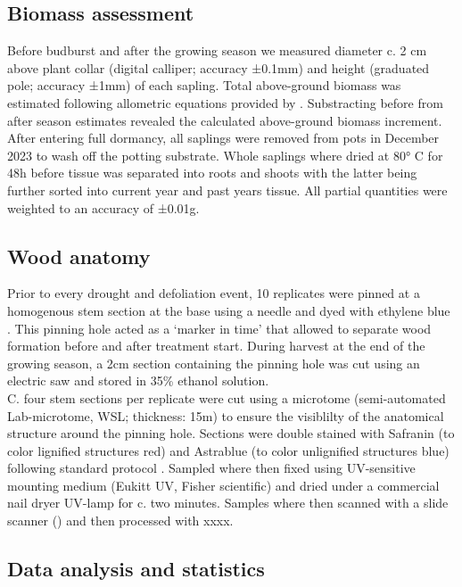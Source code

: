\documentclass{article}
\begin{document}
	\subsection*{Biomass assessment}
	Before budburst and after the growing season we measured diameter c. 2 cm above plant collar (digital calliper; accuracy ±0.1mm) and height (graduated pole; accuracy ±1mm) of each sapling. Total above-ground biomass was estimated following allometric equations provided by \citet{annighoferSpeciesspecificGenericBiomass2016}. Substracting before from after season estimates revealed the calculated above-ground biomass increment.	\\
After entering full dormancy, all saplings were removed from pots in December 2023 to wash off the potting substrate. Whole saplings where dried at 80° C for 48h before tissue was separated into roots and shoots with the latter being further sorted into current year and past years tissue. All partial quantities were weighted to an accuracy of ±0.01g.\\ %

	\subsection*{Wood anatomy}
Prior to every drought and defoliation event, 10 replicates were pinned at a homogenous stem section at the base using a needle and dyed with ethylene blue \citep{gartnerCambialActivityMoringa2021a}. This pinning hole acted as a `marker in time' that allowed to separate wood formation before and after treatment start. During harvest at the end of the growing season, a 2cm section containing the pinning hole was cut using an electric saw and stored in 35\% ethanol solution. \\
C. four stem sections per replicate were cut using a microtome (semi-automated Lab-microtome, WSL; thickness: 15\textmu m) to ensure the visiblilty of the anatomical structure around the pinning hole. Sections were double stained with Safranin (to color lignified structures red) and Astrablue (to color unlignified structures blue) following standard protocol \citep{gartnerMicroscopicPreparationTechniques2013}. Sampled where then fixed using UV-sensitive mounting medium (Eukitt UV, Fisher scientific) and dried under a commercial nail dryer UV-lamp for c. two minutes. Samples where then scanned with a slide scanner () and then processed with xxxx.

	\subsection*{Data analysis and statistics}
	
\end{document}
